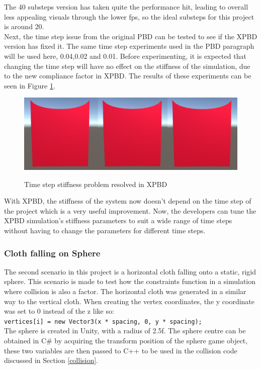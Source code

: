 \documentclass[12pt,a4paper]{article}
\begin{document}
The 40 substeps version has taken quite the performance hit, leading to overall less appealing visuals through the lower fps, so the ideal substeps for this project is around 20. \\

Next, the time step issue from the original PBD can be tested to see if the XPBD version has fixed it. The same time step experiments used in the PBD paragraph will be used here, 0.04,0.02 and 0.01. Before experimenting, it is expected that changing the time step will have no effect on the stiffness of the simulation, due to the new compliance factor in XPBD. The results of these experiments can be seen in Figure \ref{fig:xpbdcomp}.
\begin{figure}
	\centering
	\caption{Time step stiffness problem resolved in XPBD}
	\includegraphics[scale=0.35]{xpbdtscomp.png}
	\label{fig:xpbdcomp}
\end{figure}
With XPBD, the stiffness of the system now doesn't depend on the time step of the project which is a very useful improvement. Now, the developers can tune the XPBD simulation's stiffness parameters to suit a wide range of time steps without having to change the parameters for different time steps.
\subsubsection{Cloth falling on Sphere}
\label{spherescene}
The second scenario in this project is a horizontal cloth falling onto a static, rigid sphere. This scenario is made to test how the constraints function in a simulation where collision is also a factor. The horizontal cloth was generated in a similar way to the vertical cloth. When creating the vertex coordinates, the y coordinate was set to 0 instead of the z like so: \\ \lstinline{vertices[i] = new Vector3(x * spacing, 0, y * spacing);}\\

The sphere is created in Unity, with a radius of 2.5f. The sphere centre can be obtained in C\# by acquiring the transform position of the sphere game object, these two variables are then passed to C++ to be used in the collision code discussed in Section \ref{collision}. \\
\end{document}
